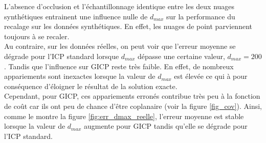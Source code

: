 L'absence d'occlusion et l'échantillonnage identique entre les deux nuages synthétiques entrainent une influence nulle de $d_{max}$ sur la performance du recalage sur les données synthétiques. En effet, les nuages de point parviennent toujours à se recaler.\\

Au contraire, sur les données réelles, on peut voir que l'erreur moyenne se dégrade pour l'ICP standard lorsque $d_{max}$ dépasse une certaine valeur, $d_{max}=200$. Tandis que l'influence sur GICP reste très faible. En effet, de nombreux appariements sont inexactes lorsque la valeur de $d_{max}$ est élevée ce qui à pour conséquence d'éloigner le résultat de la solution exacte.\\

Cependant, pour GICP, ces appariements erronés contribue très peu à la fonction de coût car ils ont peu de chance d'être coplanaire (voir la figure \ref{fig_cov}). Ainsi, comme le montre la figure \ref{fig:err_dmax_reelle}, l'erreur moyenne est stable lorsque la valeur de $d_{max}$ augmente pour GICP tandis qu'elle se dégrade pour l'ICP standard.\\

